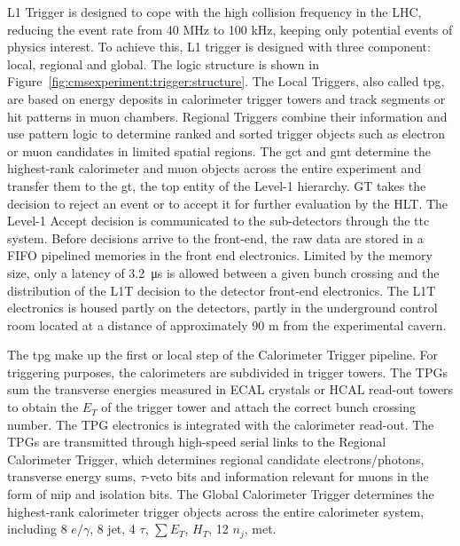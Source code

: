 L1 Trigger is designed to cope with the high collision frequency in the LHC, reducing the event rate from 40 MHz to 100 kHz, keeping only potential events of physics interest. To achieve this, L1 trigger is designed with three component: local, regional and global. The logic structure is shown in Figure~\ref{fig:cmsexperiment:trigger:structure}. The Local Triggers, also called \acrfull{tpg}, are based on energy deposits in calorimeter trigger towers and track segments or hit patterns in muon chambers. Regional Triggers combine their information and use pattern logic to determine ranked and sorted trigger objects such as electron or muon candidates in limited spatial regions. The \acrfull{gct} and \acrfull{gmt} determine the highest-rank calorimeter and muon objects across the entire experiment and transfer them to the \acrfull{gt}, the top entity of the Level-1 hierarchy. GT takes the decision to reject an event or to accept it for further evaluation by the HLT. The Level-1 Accept decision is communicated to the sub-detectors through the \acrfull{ttc} system. Before decisions arrive to the front-end, the raw data are stored in a FIFO pipelined memories in the front end electronics. Limited by the memory size, only a latency of \SI{3.2}{\us} is allowed between a given bunch crossing and the distribution of the L1T decision to the detector front-end electronics. The L1T electronics is housed partly on the detectors, partly in the underground control room located at a distance of approximately 90 m from the experimental cavern. 


The \acrfull{tpg} make up the first or local step of the Calorimeter Trigger pipeline. For triggering purposes, the calorimeters are subdivided in trigger towers. The TPGs sum the transverse energies measured in ECAL crystals or HCAL read-out towers to obtain the $E_T$ of the trigger tower and attach the correct bunch crossing number. The TPG electronics is integrated with the calorimeter read-out. The TPGs are transmitted through high-speed serial links to the Regional Calorimeter Trigger, which determines regional candidate electrons/photons, transverse energy sums, $\tau$-veto bits and information relevant for muons in the form of \acrfull{mip} and isolation bits. The Global Calorimeter Trigger determines the highest-rank calorimeter trigger objects across the entire calorimeter system, including 8 $e/\gamma$, 8 jet, 4 $\tau$, $\sum E_T$, $H_T$, 12 $n_j$, met.

